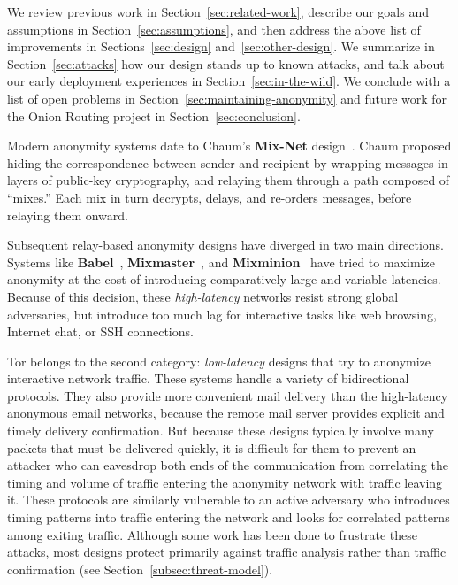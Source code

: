 \documentclass[times,10pt,twocolumn]{article}
\begin{document}
We review previous work in Section~\ref{sec:related-work}, describe
our goals and assumptions in Section~\ref{sec:assumptions},
and then address the above list of improvements in
Sections~\ref{sec:design} and~\ref{sec:other-design}. We summarize
in Section~\ref{sec:attacks} how our design stands up to
known attacks, and talk about our early deployment experiences in
Section~\ref{sec:in-the-wild}. We conclude with a list of open problems in
Section~\ref{sec:maintaining-anonymity} and future work for the Onion
Routing project in Section~\ref{sec:conclusion}.


\label{sec:related-work}

Modern anonymity systems date to Chaum's {\bf Mix-Net}
design~\cite{chaum-mix}. Chaum
proposed hiding the correspondence between sender and recipient by
wrapping messages in layers of public-key cryptography, and relaying them
through a path composed of ``mixes.''  Each mix in turn
decrypts, delays, and re-orders messages, before relaying them 
onward.

Subsequent relay-based anonymity designs have diverged in two
main directions. Systems like {\bf Babel}~\cite{babel},
{\bf Mixmaster}~\cite{mixmaster-spec},
and {\bf Mixminion}~\cite{minion-design} have tried
to maximize anonymity at the cost of introducing comparatively large and
variable latencies. Because of this decision, these \emph{high-latency}
networks resist strong global adversaries,
but introduce too much lag for interactive tasks like web browsing,
Internet chat, or SSH connections.

Tor belongs to the second category: \emph{low-latency} designs that
try to anonymize interactive network traffic. These systems handle
a variety of bidirectional protocols. They also provide more convenient
mail delivery than the high-latency anonymous email
networks, because the remote mail server provides explicit and timely
delivery confirmation. But because these designs typically
involve many packets that must be delivered quickly, it is
difficult for them to prevent an attacker who can eavesdrop both ends of the
communication from correlating the timing and volume
of traffic entering the anonymity network with traffic leaving it.  These
protocols are similarly vulnerable to an active adversary who introduces
timing patterns into traffic entering the network and looks
for correlated patterns among exiting traffic.
Although some work has been done to frustrate
these attacks, %
 most designs protect primarily against traffic analysis rather than traffic
confirmation (see Section~\ref{subsec:threat-model}).
\end{document}
